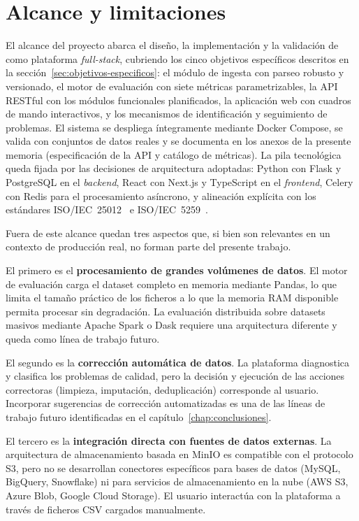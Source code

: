 \section{Alcance y limitaciones}
\label{sec:alcance-objetivos}

El alcance del proyecto abarca el diseño, la implementación y la validación
de \dataqual como plataforma \emph{full-stack}, cubriendo los cinco objetivos
específicos descritos en la sección~\ref{sec:objetivos-especificos}: el módulo
de ingesta con parseo robusto y versionado, el motor de evaluación con siete
métricas parametrizables, la \ac{API} \ac{REST}ful con los módulos funcionales
planificados, la aplicación web con cuadros de mando interactivos, y los
mecanismos de identificación y seguimiento de problemas.  El sistema se
despliega íntegramente mediante Docker Compose, se valida con conjuntos de
datos reales y se documenta en los anexos de la presente memoria
(especificación de la \ac{API} y catálogo de métricas).  La pila tecnológica
queda fijada por las decisiones de arquitectura adoptadas: Python con Flask
y PostgreSQL en el \emph{backend}, React con Next.js y TypeScript en el
\emph{frontend}, Celery con Redis para el procesamiento asíncrono, y
alineación explícita con los estándares \ac{ISO}/IEC~25012~\citep{iso25012}
e \ac{ISO}/IEC~5259~\citep{iso5259}.

Fuera de este alcance quedan tres aspectos que, si bien son relevantes en
un contexto de producción real, no forman parte del presente trabajo.

El primero es el \textbf{procesamiento de grandes volúmenes de datos}.  El
motor de evaluación carga el dataset completo en memoria mediante Pandas, lo
que limita el tamaño práctico de los ficheros a lo que la memoria RAM disponible
permita procesar sin degradación.  La evaluación distribuida sobre datasets
masivos mediante Apache Spark o Dask requiere una arquitectura diferente y
queda como línea de trabajo futuro.

El segundo es la \textbf{corrección automática de datos}.  La plataforma
diagnostica y clasifica los problemas de calidad, pero la decisión y
ejecución de las acciones correctoras (limpieza, imputación, deduplicación)
corresponde al usuario.  Incorporar sugerencias de corrección automatizadas
es una de las líneas de trabajo futuro identificadas en el
capítulo~\ref{chap:conclusiones}.

El tercero es la \textbf{integración directa con fuentes de datos externas}.
La arquitectura de almacenamiento basada en MinIO es compatible con el
protocolo S3, pero no se desarrollan conectores específicos para bases de
datos (MySQL, BigQuery, Snowflake) ni para servicios de almacenamiento en la nube
(AWS S3, Azure Blob, Google Cloud Storage).  El usuario interactúa con la
plataforma a través de ficheros \ac{CSV} cargados manualmente.


